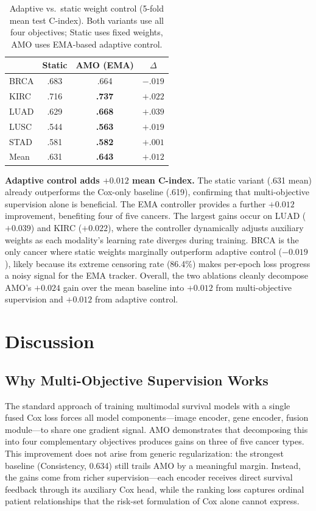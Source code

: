 \documentclass[10pt,twocolumn,letterpaper]{article}
\begin{document}
\begin{table}[t]
\centering
\caption{Adaptive vs.\ static weight control (5-fold mean test
C-index). Both variants use all four objectives; Static uses fixed
weights, AMO uses EMA-based adaptive control.}
\label{tab:ablation_ema}
\begin{tabular}{lccc}
\toprule
& Static & AMO (EMA) & $\Delta$ \\
\midrule
BRCA & .683 & .664 & $-.019$ \\
KIRC & .716 & \textbf{.737} & $+.022$ \\
LUAD & .629 & \textbf{.668} & $+.039$ \\
LUSC & .544 & \textbf{.563} & $+.019$ \\
STAD & .581 & \textbf{.582} & $+.001$ \\
\midrule
Mean & .631 & \textbf{.643} & $+.012$ \\
\bottomrule
\end{tabular}
\end{table}

\textbf{Adaptive control adds $+0.012$ mean C-index.} The static
variant (.631 mean) already outperforms the Cox-only baseline
(.619), confirming that multi-objective supervision alone is
beneficial. The EMA controller provides
a further $+0.012$ improvement, benefiting four of five cancers.
The largest gains occur on LUAD ($+0.039$) and KIRC ($+0.022$),
where the controller dynamically adjusts auxiliary weights as each
modality's learning rate diverges during training. BRCA is the only
cancer where static weights marginally outperform adaptive control
($-0.019$), likely because its extreme censoring rate (86.4\%)
makes per-epoch loss progress a noisy signal for the EMA tracker.
Overall, the two ablations cleanly decompose AMO's $+0.024$ gain
over the mean baseline into $+0.012$ from multi-objective
supervision and $+0.012$ from adaptive control.


\section{Discussion}

\subsection{Why Multi-Objective Supervision Works}

The standard approach of training multimodal survival models with
a single fused Cox loss forces all model components---image
encoder, gene encoder, fusion module---to share one gradient
signal. AMO demonstrates that decomposing this into four
complementary objectives produces gains on three of five
cancer types. This improvement does not arise from generic regularization:
the strongest baseline (Consistency, 0.634) still trails AMO
by a meaningful margin. Instead, the gains come from richer supervision---each encoder
receives direct survival feedback through its auxiliary Cox head,
while the ranking loss captures ordinal patient relationships that
the risk-set formulation of Cox alone cannot express.
\end{document}
